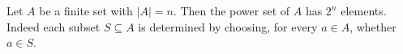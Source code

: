 Let $A$ be a finite set with $\lvert A \rvert = n$.
Then the power set of $A$ has $2^{n}$ elements.
Indeed each subset $S \subseteq A$ is determined by choosing, for every $a \in A$, whether $a \in S$.